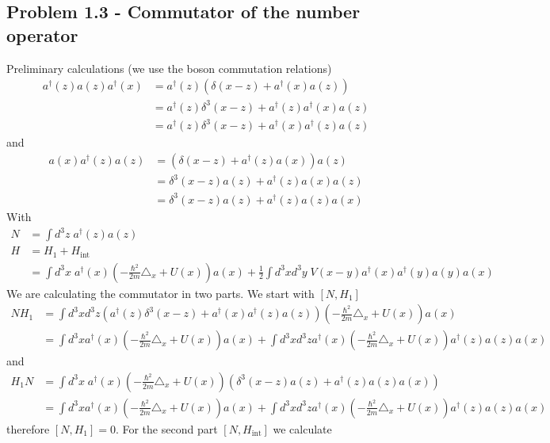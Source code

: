 \documentclass[10pt,a4paper]{book}
\theoremstyle{definition}
\begin{document}
\subsection{Problem 1.3 - Commutator of the number operator}
Preliminary calculations (we use the boson commutation relations)
\begin{align}
a^\dagger(z)a(z)a^\dagger(x)&=a^\dagger(z)(\delta(x-z)+a^\dagger(x)a(z))\\
&=a^\dagger(z)\delta^3(x-z)+a^\dagger(z)a^\dagger(x)a(z)\\
&=a^\dagger(z)\delta^3(x-z)+a^\dagger(x)a^\dagger(z)a(z)
\end{align}
and
\begin{align}
a(x)a^\dagger(z)a(z)&=(\delta(x-z)+a^\dagger(z)a(x))a(z)\\
&=\delta^3(x-z)a(z)+a^\dagger(z)a(x)a(z)\\
&=\delta^3(x-z)a(z)+a^\dagger(z)a(z)a(x)
\end{align}
With
\begin{align}
N&=\int d^3z\; a^\dagger(z)a(z)\\
H&=H_1+H_\text{int}\\
&=\int d^3x\; a^\dagger(x)\left(-\frac{\hbar^2}{2m}\triangle_x+U(x)\right)a(x)+\frac{1}{2}\int d^3xd^3y\;V(x-y) a^\dagger(x)a^\dagger(y)a(y)a(x)
\end{align}
We are calculating the commutator in two parts. We start with $[N,H_1]$
\begin{align}
N H_1&=\int d^3xd^3z\left(a^\dagger(z)\delta^3(x-z)+a^\dagger(x)a^\dagger(z)a(z)\right)\left(-\frac{\hbar^2}{2m}\triangle_x+U(x)\right)a(x)\\
&=\int d^3xa^\dagger(x)\left(-\frac{\hbar^2}{2m}\triangle_x+U(x)\right)a(x)+\int d^3xd^3za^\dagger(x)\left(-\frac{\hbar^2}{2m}\triangle_x+U(x)\right)a^\dagger(z)a(z)a(x)
\end{align}
and
\begin{align}
H_1N&=\int d^3x\; a^\dagger(x)\left(-\frac{\hbar^2}{2m}\triangle_x+U(x)\right)(\delta^3(x-z)a(z)+a^\dagger(z)a(z)a(x))\\
&=\int d^3xa^\dagger(x)\left(-\frac{\hbar^2}{2m}\triangle_x+U(x)\right)a(x)+\int d^3xd^3za^\dagger(x)\left(-\frac{\hbar^2}{2m}\triangle_x+U(x)\right)a^\dagger(z)a(z)a(x)
\end{align}
therefore $[N,H_1]=0$.
For the second part $[N,H_\text{int}]$ we calculate
\end{document}
